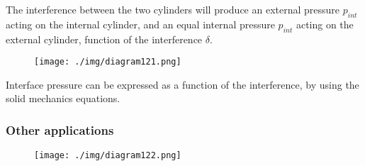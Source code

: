 The interference between the two cylinders will produce an external pressure $p_{int}$ acting on the internal cylinder, and an equal internal pressure $p_{int}$ acting on the external cylinder, function of the interference $\delta$.
\begin{figure}[H]
    \centering
    \texttt{[image: ./img/diagram121.png]}
    \caption{}
\end{figure}
Interface pressure can be expressed as a function of the interference, by using the solid mechanics equations.
\subsubsection{Other applications}
\begin{figure}[H]
    \centering
    \texttt{[image: ./img/diagram122.png]}
    \caption{}
\end{figure}
